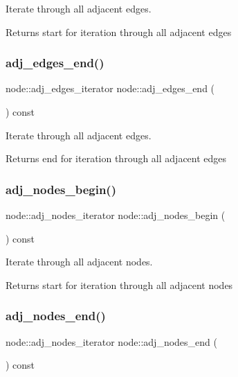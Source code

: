 Iterate through all adjacent edges.

\begin{DoxyReturn}{Returns}
start for iteration through all adjacent edges 
\end{DoxyReturn}
\mbox{\label{classnode_aa1e7887d29390297580769454f769ad6}} 
\subsubsection{\texorpdfstring{adj\+\_\+edges\+\_\+end()}{adj\_edges\_end()}}
{\footnotesize\ttfamily node\+::adj\+\_\+edges\+\_\+iterator node\+::adj\+\_\+edges\+\_\+end (\begin{DoxyParamCaption}{ }\end{DoxyParamCaption}) const}

Iterate through all adjacent edges.

\begin{DoxyReturn}{Returns}
end for iteration through all adjacent edges 
\end{DoxyReturn}
\mbox{\label{classnode_a6cd2febf910bc6572c4aecba6278b100}} 
\subsubsection{\texorpdfstring{adj\+\_\+nodes\+\_\+begin()}{adj\_nodes\_begin()}}
{\footnotesize\ttfamily node\+::adj\+\_\+nodes\+\_\+iterator node\+::adj\+\_\+nodes\+\_\+begin (\begin{DoxyParamCaption}{ }\end{DoxyParamCaption}) const}

Iterate through all adjacent nodes.

\begin{DoxyReturn}{Returns}
start for iteration through all adjacent nodes 
\end{DoxyReturn}
\mbox{\label{classnode_a2477fa92c56a19d29464082444a3043a}} 
\subsubsection{\texorpdfstring{adj\+\_\+nodes\+\_\+end()}{adj\_nodes\_end()}}
{\footnotesize\ttfamily node\+::adj\+\_\+nodes\+\_\+iterator node\+::adj\+\_\+nodes\+\_\+end (\begin{DoxyParamCaption}{ }\end{DoxyParamCaption}) const}

